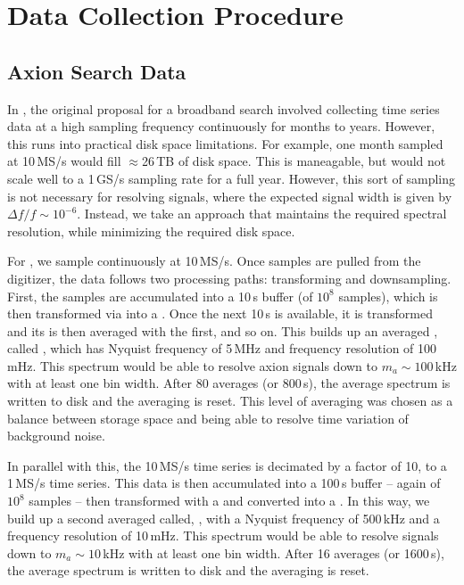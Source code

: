 \documentclass[aps,prd,amsmath,amssymb,reprint,superscriptaddress, nofootinbib,
]{revtex4-1}
\begin{document}
 
\section{Data Collection Procedure}
\label{sec:DataCollection}
\subsection{Axion Search Data}
\label{sec:AxionSearchData}

In \cite{ABRA2016}, the original proposal for a broadband search involved collecting time series data at a high sampling frequency continuously for months to years. However, this runs into practical disk space limitations. For example, one month sampled at 10\,MS/s would fill $\approx$26\,TB of disk space. This is maneagable, but would not scale well to a 1\,GS/s sampling rate for a full year. However, this sort of sampling is not necessary for resolving \ADM signals, where the expected signal width is given by $\Delta f/f\sim10^{-6}$. Instead, we take an approach that maintains the required spectral resolution, while minimizing the required disk space. 

For \abra, we sample continuously at 10\,MS/s. Once samples are pulled from the digitizer, the data follows two processing paths: transforming and downsampling. First, the samples are accumulated into a 10\,s buffer (of $10^8$ samples), which is then transformed via \DFT \cite{FFTW05} into a \PSD. Once the next 10\,s is available, it is transformed and its \PSD is then averaged with the first, and so on. This builds up an averaged \PSD, called \Pten, which has Nyquist frequency of 5\,MHz and frequency resolution of 100\,mHz. This spectrum would be able to resolve axion signals down to $m_a\sim 100$\,kHz with at least one bin width. After 80 averages (or 800\,s), the average spectrum is written to disk and the averaging is reset. This level of averaging was chosen as a balance between storage space and being able to resolve time variation of background noise.

In parallel with this, the 10\,MS/s time series is decimated by a factor of 10, to a 1\,MS/s time series. This data is then accumulated into a 100\,s buffer -- again of $10^8$ samples -- then transformed with a \DFT and converted into a \PSD. In this way, we build up a second averaged \PSD called, \Pone, with a Nyquist frequency of 500\,kHz and a frequency resolution of 10\,mHz. This spectrum would be able to resolve signals down to $m_a\sim10$\,kHz with at least one bin width. After 16 averages (or 1600\,s), the average spectrum is written to disk and the averaging is reset.
\end{document}
